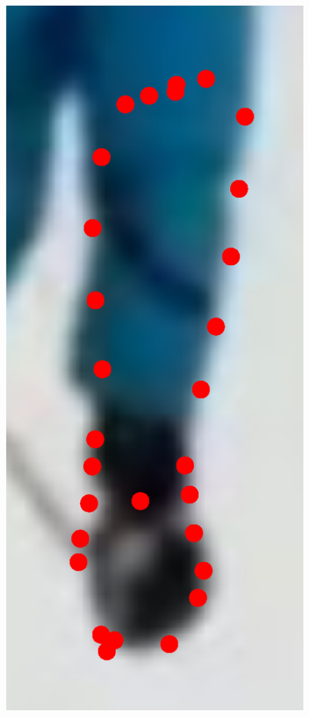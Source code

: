 \begin{figure}[!t]
    \includegraphics[height=\ofh]{resources/Fittings/31.eps}
    \hfill

\end{figure}
